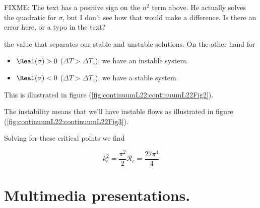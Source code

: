 FIXME: The text has a positive sign on the $n^2$ term above.  He actually solves the quadratic for $\sigma$, but I don't see how that would make a difference.  Is there an error here, or a typo in the text?

the value that separates our stable and unstable solutions.  On the other hand for
\begin{itemize}
\item $\Real(\sigma) > 0$ ($\Delta T > \Delta T_e$), we have an instable system.
\item $\Real(\sigma) < 0$ ($\Delta T > \Delta T_e$), we have a stable system.
\end{itemize}

This is illustrated in figure (\ref{fig:continuumL22:continuumL22Fig2}).


The instability means that we'll have instable flows as illustrated in figure (\ref{fig:continuumL22:continuumL22Fig3}).


Solving for these critical points we find

\begin{subequations}
\begin{equation}\label{eqn:continuumL22:530}
k_e^2 = \frac{\pi^2}{2}
\end{equation}
\begin{equation}\label{eqn:continuumL22:550}
\mathcal{R}_e = \frac{27 \pi^4}{4}
\end{equation}
\end{subequations}

\section{Multimedia presentations.}


